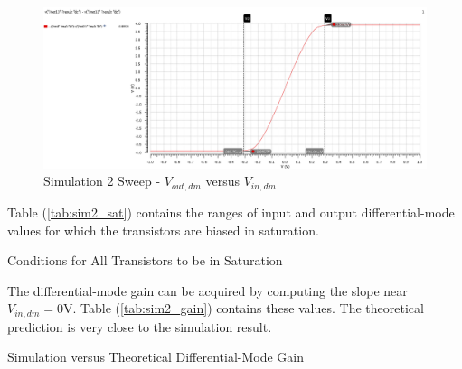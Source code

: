 \FloatBarrier

\begin{figure}[h!]
	\centering
	\includegraphics[scale=0.40]{./images/sim2_sweep.PNG}
	\caption{Simulation 2 Sweep - $V_{out,dm}$ versus $V_{in,dm}$}
	\label{fig:sim2_sweep}
\end{figure}

\FloatBarrier

Table (\ref{tab:sim2_sat}) contains the ranges of input and output differential-mode values for which the transistors are biased in saturation.

\FloatBarrier

\begin{table}[h!]
	\centering
	\caption{Conditions for All Transistors to be in Saturation}
	\label{tab:sim2_sat}
\end{table}

\FloatBarrier

The differential-mode gain can be acquired by computing the slope near $V_{in,dm} = 0$\si{\volt}.
Table (\ref{tab:sim2_gain}) contains these values.
The theoretical prediction is very close to the simulation result.

\FloatBarrier

\begin{table}[h!]
	\centering
	\caption{Simulation versus Theoretical Differential-Mode Gain}
	\label{tab:sim2_gain}
\end{table}

\FloatBarrier

